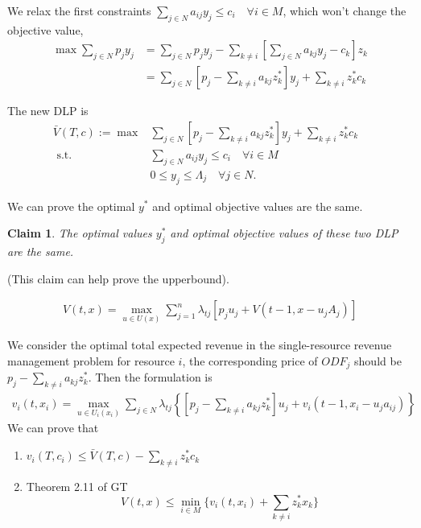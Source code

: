 \documentclass[11pt,a4paper]{article}
\newtheorem{claim}{Claim}
\begin{document}
We relax the first constraints $\sum_{j \in N} a_{i j} y_{j} \leq c_{i}\quad \forall i\in M$, which won't change the objective value,
\begin{equation}
    \begin{aligned}
        \max\sum_{j \in N} p_{j} y_{j}&=\sum_{j \in N} p_{j} y_{j}-\sum_{k\neq i}[\sum_{j \in N} a_{k j} y_{j} - c_{k}]z_k\\
        &=\sum_{j\in N}[p_j-\sum_{k\neq i}a_{kj}z_k^*]y_j+\sum_{k\neq i}z_k^*c_k
    \end{aligned}
    \nonumber
\end{equation}

The new DLP is
$$\begin{array}{rlr}
    \bar{V}(T, c):=\max&\sum_{j\in N}[p_j-\sum_{k\neq i}a_{kj}z_k^*]y_j+\sum_{k\neq i}z_k^*c_k & \\
    \text { s.t. } & \sum_{j \in N} a_{i j} y_{j} \leq c_{i} \quad \forall i \in M \\
    & 0 \leq y_{j} \leq \Lambda_{j} \quad \forall j \in N .
\end{array}$$

We can prove the optimal $y^*$ and optimal objective values are the same.

\begin{claim}
The optimal values $y_j^*$ and optimal objective values of these two DLP are the same.
\end{claim}
(This claim can help prove the upperbound).

\begin{equation}
    \begin{aligned}
        V(t,x)=\max_{u\in U(x)}\sum_{j=1}^n\lambda_{tj}[p_ju_j+V(t-1,x-u_jA_j)]
    \end{aligned}
    \nonumber
\end{equation}

We consider the optimal total expected revenue in the single-resource revenue management problem for resource $i$, the corresponding price of ${ODF}_j$ should be $p_j-\sum_{k\neq i}a_{kj}z_k^*$.
Then the formulation is
\begin{equation}
    \begin{aligned}
        v_i(t,x_i)=\max_{u\in U_i(x_i)}\sum_{j\in N}\lambda_{tj}\left\{[p_j-\sum_{k\neq i}a_{kj}z_k^*]u_j+v_i(t-1,x_i-u_ja_{ij})\right\}
    \end{aligned}
    \nonumber
\end{equation}
We can prove that
\begin{enumerate}[$\bullet$]
    \item $v_i(T,c_i)\leq \bar{V}(T,c)-\sum_{k\neq i}z_k^*c_k$
    \item Theorem 2.11 of GT $$V(t,x)\leq \min_{i\in M}\{v_i(t,x_i)+\sum_{k\neq i}z_k^*x_k\}$$
\end{enumerate}
\end{document}
